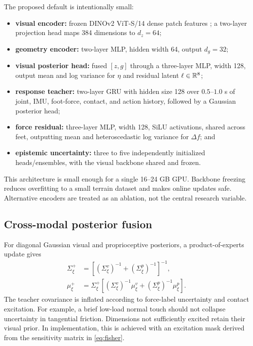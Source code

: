 The proposed default is intentionally small:
\begin{itemize}
  \item \textbf{visual encoder:} frozen DINOv2 ViT-S/14 dense patch features \citep{oquab2023dinov2}; a two-layer projection head maps 384 dimensions to $d_z=64$;
  \item \textbf{geometry encoder:} two-layer MLP, hidden width 64, output $d_g=32$;
  \item \textbf{visual posterior head:} fused $[z,g]$ through a three-layer MLP, width 128, output mean and log variance for $\eta$ and residual latent $\ell\in\mathbb{R}^8$;
  \item \textbf{response teacher:} two-layer GRU with hidden size 128 over $0.5$--$1.0$ s of joint, IMU, foot-force, contact, and action history, followed by a Gaussian posterior head;
  \item \textbf{force residual:} three-layer MLP, width 128, SiLU activations, shared across feet, outputting mean and heteroscedastic log variance for $\Delta f$; and
  \item \textbf{epistemic uncertainty:} three to five independently initialized heads/ensembles, with the visual backbone shared and frozen.
\end{itemize}

This architecture is small enough for a single 16--24 GB GPU. Backbone freezing reduces overfitting to a small terrain dataset and makes online updates safe. Alternative encoders are treated as an ablation, not the central research variable.

\subsection{Cross-modal posterior fusion}

For diagonal Gaussian visual and proprioceptive posteriors, a product-of-experts update gives
\begin{align}
\Sigma_\xi^+ &= \left[(\Sigma_\xi^v)^{-1}+(\Sigma_\xi^p)^{-1}\right]^{-1},\\
\mu_\xi^+ &= \Sigma_\xi^+\left[(\Sigma_\xi^v)^{-1}\mu_\xi^v+(\Sigma_\xi^p)^{-1}\mu_\xi^p\right].
\label{eq:gaussian_fusion}
\end{align}
The teacher covariance is inflated according to force-label uncertainty and contact excitation. For example, a brief low-load normal touch should not collapse uncertainty in tangential friction. Dimensions not sufficiently excited retain their visual prior. In implementation, this is achieved with an excitation mask derived from the sensitivity matrix in \cref{eq:fisher}.

